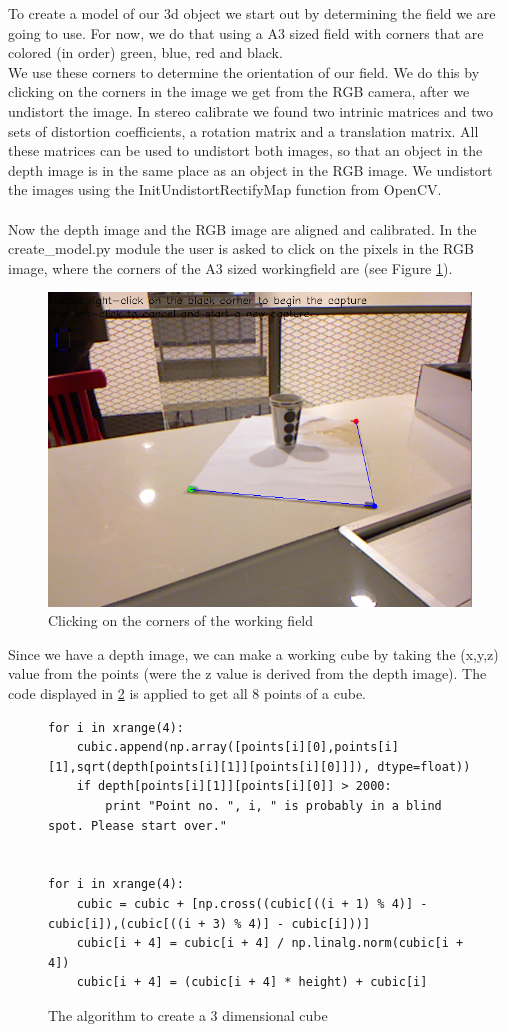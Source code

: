 To create a model  of our 3d object we start out by determining the field we are going to use. For now, we do that using a A3 sized field with corners that are colored (in order) green, blue, red and black. \\
We use these corners to determine the orientation of our field. We do this by clicking on the corners in the image we get from the RGB camera, after we undistort the image. In stereo calibrate we found two intrinic matrices and two sets of distortion coefficients, a rotation matrix and a translation matrix. All these matrices can be used to undistort both images, so that an object in the depth image is in the same place as an object in the RGB image. We undistort the images using the InitUndistortRectifyMap function from OpenCV. \\
\\
Now the depth image and the RGB image are aligned and calibrated. In the create\_model.py module the user is asked to click on the pixels in the RGB image, where the corners of the A3 sized workingfield are (see Figure \ref{fig:clicking}).
\begin{figure}[H]
\centering
\includegraphics[scale=0.5]{images/clicking.png}
\caption{Clicking on the corners of the working field}
\label{fig:clicking}
\end{figure}
Since we have a depth image, we can make a working cube by taking the (x,y,z) value from the points (were the z value is derived from the depth image). The code displayed in \ref{code:cube} is applied to get all 8 points of a cube.\\
\begin{figure}[H]
\begin{lstlisting}
for i in xrange(4):
    cubic.append(np.array([points[i][0],points[i][1],sqrt(depth[points[i][1]][points[i][0]]]), dtype=float))
    if depth[points[i][1]][points[i][0]] > 2000:
        print "Point no. ", i, " is probably in a blind spot. Please start over."


for i in xrange(4):
    cubic = cubic + [np.cross((cubic[((i + 1) % 4)] - cubic[i]),(cubic[((i + 3) % 4)] - cubic[i]))]
    cubic[i + 4] = cubic[i + 4] / np.linalg.norm(cubic[i + 4])
    cubic[i + 4] = (cubic[i + 4] * height) + cubic[i]
\end{lstlisting}
\caption{The algorithm to create a 3 dimensional cube}
\label{code:cube}
\end{figure}
